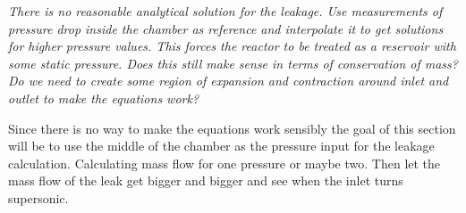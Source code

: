 {\color{greenColor}\itshape
There is no reasonable analytical solution for the leakage.
Use measurements of pressure drop inside the chamber as reference and interpolate it to get solutions for higher pressure values.
This forces the reactor to be treated as a reservoir with some static pressure.
Does this still make sense in terms of conservation of mass?
Do we need to create some region of expansion and contraction around inlet and outlet to make the equations work?

Since there is no way to make the equations work sensibly the goal of this section will be to use the middle of the chamber as the pressure input for the leakage calculation.
Calculating mass flow for one pressure or maybe two.
Then let the mass flow of the leak get bigger and bigger and see when the inlet turns supersonic.
}
